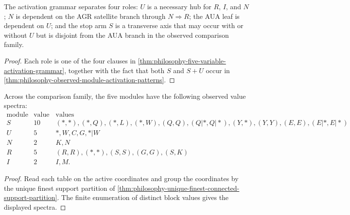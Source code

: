 \begin{corollary}
\label{cor:philosophy-hub-branches-transverse-arm}
The activation grammar separates four roles: $U$ is a necessary hub for
$R$, $I$, and $N$; $N$ is dependent on the AGR satellite branch through
$N\Rightarrow R$; the AUA leaf is dependent on $U$; and the stop arm
$S$ is a transverse axis that may occur with or without $U$ but is
disjoint from the AUA branch in the observed comparison family.
\end{corollary}
\begin{proof}
Each role is one of the four clauses in
\autoref{thm:philosophy-five-variable-activation-grammar}, together
with the fact that both $S$ and $S+U$ occur in
\autoref{thm:philosophy-observed-module-activation-patterns}.
\end{proof}

\begin{theorem}
\label{thm:philosophy-module-value-spectrum}
Across the comparison family, the five modules have the following
observed value spectra:
$$
\begin{array}{c|c|l}
  \text{module} & \text{value count} & \text{values}\\
\hline
  S & 10 &
  (*,*),(*,Q),(*,L),(*,W),(Q,Q),(Q|*,Q|*),(Y,*),(Y,Y),(E,E),(E|*,E|*)\\
  U & 5 & *,W,C,G,*|W\\
  N & 2 & K,N\\
  R & 5 & (R,R),(*,*),(S,S),(G,G),(S,K)\\
  I & 2 & I,M.
\end{array}
$$
\end{theorem}
\begin{proof}
Read each table on the active coordinates and group the coordinates by
the unique finest support partition of
\autoref{thm:philosophy-unique-finest-connected-support-partition}.
The finite enumeration of distinct block values gives the displayed
spectra.
\end{proof}

